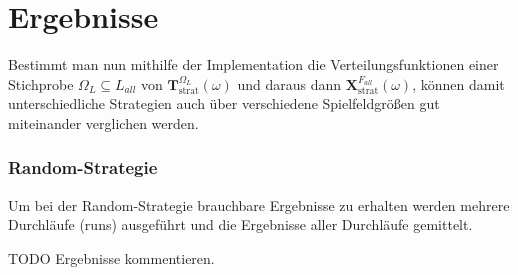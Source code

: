 \documentclass[a4paper,12pt]{llncs}
\numberwithin{equation}{section}
\DeclareMathOperator{\strat}{strat}
\begin{document}


\section{Ergebnisse}


Bestimmt man nun mithilfe der Implementation die Verteilungsfunktionen einer Stichprobe $\Omega_L \subseteq L_{all}$ von $\mathbf{T}^{\Omega_L}_{\strat}(\omega)$ und daraus dann $\mathbf{X}^{F_{all}}_{\strat}(\omega)$, können damit unterschiedliche Strategien auch über verschiedene Spielfeldgrößen gut miteinander verglichen werden.

\subsubsection{Random-Strategie}

Um bei der Random-Strategie brauchbare Ergebnisse zu erhalten werden mehrere Durchläufe (runs) ausgeführt und die Ergebnisse aller Durchläufe gemittelt.

TODO Ergebnisse kommentieren.

\begin{landscape}
	
\end{landscape}

\begin{landscape}
	
\end{landscape}

\begin{landscape}
	
\end{landscape}

\begin{landscape}
	
\end{landscape}


\begin{landscape}
	
\end{landscape}


\begin{landscape}
	
\end{landscape}
\end{document}
